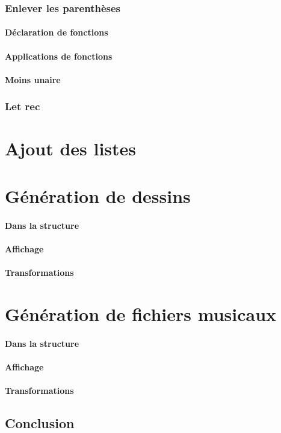\documentclass{report}
\begin{document}
\section{Enlever les parenthèses}
\subsection{Déclaration de fonctions}
\subsection{Applications de fonctions}
\subsection{Moins unaire}

\section{Let rec}

\part{Ajout des listes}

\part{Génération de dessins}
\subsection{Dans la structure}
\subsection{Affichage}
\subsection{Transformations}

\part{Génération de fichiers musicaux}
\subsection{Dans la structure}
\subsection{Affichage}
\subsection{Transformations}

\chapter*{Conclusion}
\end{document}
